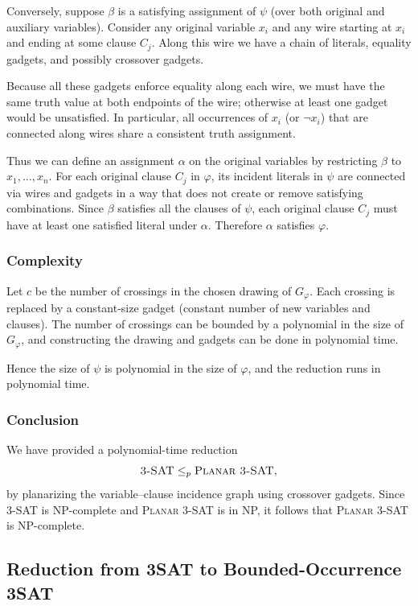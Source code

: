 \documentclass[9pt]{extarticle}
\begin{document}
Conversely, suppose $\beta$ is a satisfying assignment of $\psi$ (over both
original and auxiliary variables).  Consider any original variable $x_i$ and any
wire starting at $x_i$ and ending at some clause $C_j$.  Along this wire we have
a chain of literals, equality gadgets, and possibly crossover gadgets.

Because all these gadgets enforce equality along each wire, we must have the
same truth value at both endpoints of the wire; otherwise at least one gadget
would be unsatisfied.  In particular, all occurrences of $x_i$ (or $\neg x_i$)
that are connected along wires share a consistent truth assignment.

Thus we can define an assignment $\alpha$ on the original variables by
restricting $\beta$ to $x_1,\dots,x_n$.  For each original clause $C_j$ in
$\varphi$, its incident literals in $\psi$ are connected via wires and gadgets
in a way that does not create or remove satisfying combinations.  Since $\beta$
satisfies all the clauses of $\psi$, each original clause $C_j$ must have at
least one satisfied literal under $\alpha$.  Therefore $\alpha$ satisfies
$\varphi$.

\subsubsection*{Complexity}

Let $c$ be the number of crossings in the chosen drawing of $G_\varphi$.
Each crossing is replaced by a constant-size gadget (constant number of new
variables and clauses).  The number of crossings can be bounded by a polynomial
in the size of $G_\varphi$, and constructing the drawing and gadgets can be
done in polynomial time.

Hence the size of $\psi$ is polynomial in the size of $\varphi$, and the
reduction runs in polynomial time.

\subsubsection*{Conclusion}

We have provided a polynomial-time reduction
\[
    \textsc{3-SAT} \le_p \textsc{Planar 3-SAT},
\]
by planarizing the variable–clause incidence graph using crossover gadgets.
Since \textsc{3-SAT} is NP-complete and \textsc{Planar 3-SAT} is in NP, it
follows that \textsc{Planar 3-SAT} is NP-complete.

\subsection{Reduction from 3SAT to Bounded-Occurrence 3SAT}
\end{document}
